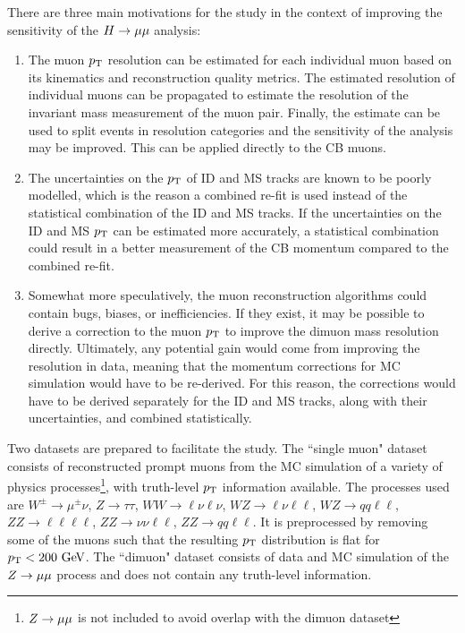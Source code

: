 There are three main motivations for the study in the context of
improving the sensitivity of the $H \rightarrow \mu\mu$ analysis:
\begin{enumerate}
\item The muon $p_{\text{T}}$ resolution can be estimated for each individual muon
based on its kinematics and reconstruction quality metrics. The estimated
resolution of individual muons can be propagated to estimate the resolution
of the invariant mass measurement of the muon pair. Finally, the estimate
can be used to split events in resolution categories and the sensitivity of
the analysis may be improved. This can be applied directly to the CB muons.

\item The uncertainties on the $p_{\text{T}}$ of ID and MS tracks are known to be
poorly modelled, which is the reason a combined re-fit is used instead of
the statistical combination of the ID and MS tracks. If the uncertainties
on the ID and MS $p_{\text{T}}$ can be estimated more accurately, a statistical
combination could result in a better measurement of the CB momentum compared to the
combined re-fit.

\item Somewhat more speculatively, the muon reconstruction
algorithms could contain bugs, biases, or inefficiencies. If they exist,
it may be possible to 
derive a correction to the muon $p_{\text{T}}$ to improve the dimuon mass resolution
directly. Ultimately, any potential gain would come from improving the
resolution in data, meaning that the momentum corrections for MC
simulation would have to be re-derived. For this reason, the
corrections would have to be derived separately for the ID and MS
tracks, along with their uncertainties, and combined statistically.
\end{enumerate}
Two datasets are prepared to facilitate the study. The ``single muon"
dataset consists of reconstructed prompt muons from the MC simulation
of a variety of physics processes\footnote{$Z \rightarrow \mu\mu$ is not included to avoid overlap
with the dimuon dataset}, with truth-level $p_{\text{T}}$ information
available. The processes used are 
$W^\pm\rightarrow\mu^\pm \nu$, $Z\rightarrow \tau\tau$,
$WW\rightarrow \ell \nu \ell \nu$, $WZ\rightarrow \ell \nu \ell \ell$,
$WZ\rightarrow qq \ell \ell$, $ZZ\rightarrow\ell\ell\ell\ell$,
$ZZ\rightarrow\nu\nu\ell\ell$, $ZZ\rightarrow qq\ell\ell$.
It is preprocessed by removing some of the muons such that the resulting
$p_{\text{T}}$ distribution is flat for $p_{\text{T}} < 200~\text{Ge\kern -0.1em V}$. The ``dimuon"
dataset consists of data and MC simulation of the $Z \rightarrow \mu\mu$ process
and does not contain any truth-level information.

